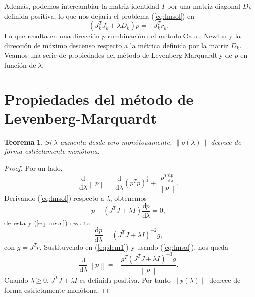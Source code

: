 \documentclass[11pt,a4paper]{book}
\newtheorem{theorem}{Teorema}[chapter]
\theoremstyle{definition}
\theoremstyle{remark}
\newcommand{\norm}[1]{\left\lVert#1\right\rVert}
\begin{document}
Además, podemos intercambiar la matriz identidad $I$ por una matriz diagonal $D_k$ definida positiva, lo que nos dejaría el problema (\ref{eq:lmsol}) en
\begin{equation}
	(J_k^TJ_k+\lambda D_k)p = -J_k^Tr_k.
\end{equation}
Lo que resulta en una dirección $p$ combinación del método Gauss-Newton y la dirección de máximo descenso respecto a la métrica definida por la matriz $D_k$.
Veamos una serie de propiedades del método de Levenberg-Marquardt y de $p$ en función de $\lambda$. 

\section{Propiedades del método de Levenberg-Marquardt}
\begin{theorem}
	Si $\lambda$ aumenta desde cero monótonamente, $\norm{p(\lambda)}$ decrece de forma estrictamente monótona.
\end{theorem}
\begin{proof}
	Por un lado,
	\begin{equation}
		\label{eq:dem1}
		\frac{\mathrm{d}}{\mathrm{d}\lambda}\norm{p}=
		\frac{\mathrm{d}}{\mathrm{d}\lambda}(p^Tp)^{\frac{1}{2}}+
		\frac{p^T\frac{\mathrm{d}p}{\mathrm{d}\lambda}}{\norm{p}}.
	\end{equation}
	Derivando (\ref{eq:lmsol}) respecto a $\lambda$, obtenemos
	\begin{equation}
		\label{eq:dem2}
		p + (J^TJ+\lambda I)\frac{\mathrm{d}p}{\mathrm{d}\lambda} = 0,
	\end{equation}
	de esta y (\ref{eq:lmsol}) resulta
	\begin{equation}
		\label{eq:dem3}
		\frac{\mathrm{d}p}{\mathrm{d}\lambda}=(J^TJ+\lambda I)^{-2}g,
	\end{equation}
	con $g=J^Tr$. Sustituyendo en (\ref{eq:dem1}) y usando (\ref{eq:lmsol}), nos queda
	\begin{equation}
		\frac{\mathrm{d}}{\mathrm{d}\lambda}\norm{p}=
		-\frac{g^T(J^TJ+\lambda I)^{-3}g}{\norm{p}}.
	\end{equation}
	Cuando $\lambda \geq 0,\, J^TJ+\lambda I$ es definida positiva. Por tanto $\norm{p(\lambda)}$ 
	decrece de forma estrictamente monótona.
\end{proof}
\end{document}
